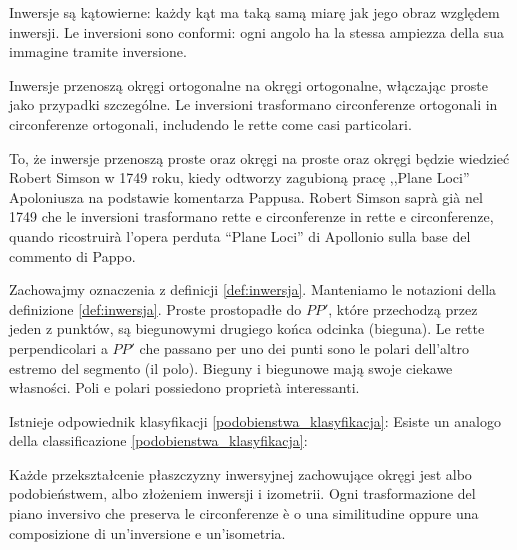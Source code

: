 \begin{proposition}
    Inwersje są kątowierne: każdy kąt ma taką samą miarę jak jego obraz względem inwersji. %
    Le inversioni sono conformi: ogni angolo ha la stessa ampiezza della sua immagine tramite inversione. %
\end{proposition}

\begin{proposition}
    Inwersje przenoszą okręgi ortogonalne na okręgi ortogonalne, włączając proste jako przypadki szczególne. %
    Le inversioni trasformano circonferenze ortogonali in circonferenze ortogonali, includendo le rette come casi particolari. %
\end{proposition}

To, że inwersje przenoszą proste oraz okręgi na proste oraz okręgi będzie wiedzieć Robert Simson w 1749 roku, kiedy odtworzy zagubioną pracę ,,Plane Loci'' Apoloniusza na podstawie komentarza Pappusa. %
Robert Simson saprà già nel 1749 che le inversioni trasformano rette e circonferenze in rette e circonferenze, quando ricostruirà l'opera perduta ``Plane Loci'' di Apollonio sulla base del commento di Pappo. %
\label{plane_loci}%
%

Zachowajmy oznaczenia z definicji \ref{def:inwersja}. %
Manteniamo le notazioni della definizione \ref{def:inwersja}. %
Proste prostopadłe do $PP'$, które przechodzą przez jeden z punktów, są biegunowymi drugiego końca odcinka (bieguna). %
Le rette perpendicolari a $PP'$ che passano per uno dei punti sono le polari dell'altro estremo del segmento (il polo). %
Bieguny i biegunowe mają swoje ciekawe własności. %
Poli e polari possiedono proprietà interessanti. %


Istnieje odpowiednik klasyfikacji \ref{podobienstwa_klasyfikacja}: %
Esiste un analogo della classificazione \ref{podobienstwa_klasyfikacja}: %

\begin{proposition}
    Każde przekształcenie płaszczyzny inwersyjnej zachowujące okręgi jest albo podobieństwem, albo złożeniem inwersji i izometrii. %
    Ogni trasformazione del piano inversivo che preserva le circonferenze è o una similitudine oppure una composizione di un'inversione e un'isometria. %
\end{proposition}

